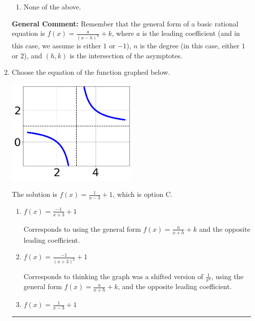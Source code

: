 \documentclass{extbook}[14pt]
\newcommand{\litem}[1]{\item #1

\rule{\textwidth}{0.4pt}}
\begin{document}
\begin{enumerate}
{\begin{enumerate}[label=\Alph*.]
\item None of the above.\end{enumerate}
\textbf{General Comment:} Remember that the general form of a basic rational equation is $ f(x) = \frac{a}{(x-h)^n} + k$, where $a$ is the leading coefficient (and in this case, we assume is either $1$ or $-1$), $n$ is the degree (in this case, either $1$ or $2$), and $(h, k)$ is the intersection of the asymptotes.
}
\litem{
Choose the equation of the function graphed below.

\begin{center}
    \includegraphics[width=0.5\textwidth]{../Figures/rationalGraphToEquationC.png}
\end{center}


The solution is \( f(x) = \frac{1}{x - 3} + 1 \), which is option C.\begin{enumerate}[label=\Alph*.]
\item \( f(x) = \frac{-1}{x + 3} + 1 \)

Corresponds to using the general form $f(x) = \frac{a}{x+h}+k$ and the opposite leading coefficient.
\item \( f(x) = \frac{-1}{(x + 3)^2} + 1 \)

Corresponds to thinking the graph was a shifted version of $\frac{1}{x^2}$, using the general form $f(x) = \frac{a}{x+h}+k$, and the opposite leading coefficient.
\item \( f(x) = \frac{1}{x - 3} + 1 \)


\end{enumerate}}
\end{enumerate}
\end{document}

